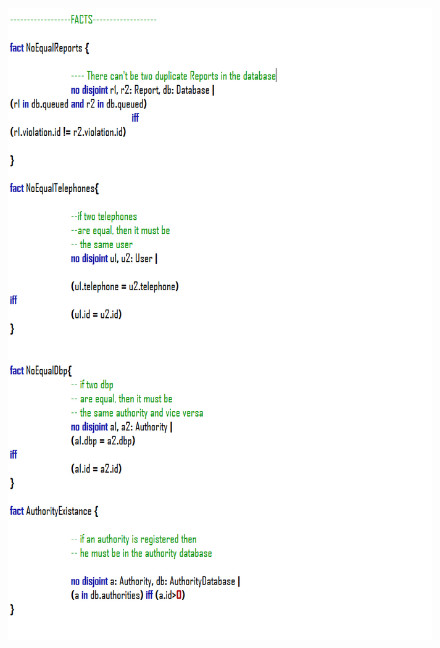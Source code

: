 \documentclass[12pt,a4paper]{article}
\begin{document}
			\begin{figure}[H]
				\centering
				\includegraphics[width=1\linewidth]{../assets/images/exports/user/Facts 1.png}
				\label{fig:facts1}
			\end{figure}
\end{document}
